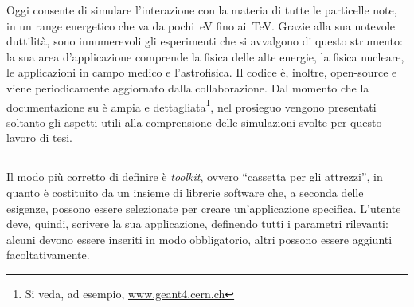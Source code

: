 Oggi \geant{} consente di simulare l'interazione con la materia di tutte le particelle note, in un range energetico che va da pochi~eV fino ai~TeV.
%
Grazie alla sua notevole duttilità, sono innumerevoli gli esperimenti che si avvalgono di questo strumento: la sua area d'applicazione comprende la fisica delle alte energie, la fisica nucleare, le applicazioni in campo medico e l'astrofisica.
Il codice è, inoltre, open-source e viene periodicamente aggiornato dalla collaborazione. 
Dal momento che la documentazione su \geant{} è ampia e dettagliata\footnote{Si veda, ad esempio, \url{www.geant4.cern.ch}}, nel prosieguo vengono presentati soltanto gli aspetti utili alla comprensione delle simulazioni svolte per questo lavoro di tesi.  




\subsection{}

Il modo più corretto di definire \geant{} è \emph{toolkit}, ovvero ``cassetta per gli attrezzi'', in quanto è costituito da un insieme di librerie software che, a seconda delle esigenze, possono essere selezionate per creare un'applicazione specifica.
L'utente deve, quindi, scrivere la sua applicazione, definendo tutti i parametri rilevanti: alcuni devono essere inseriti in modo obbligatorio, altri possono essere aggiunti facoltativamente.

